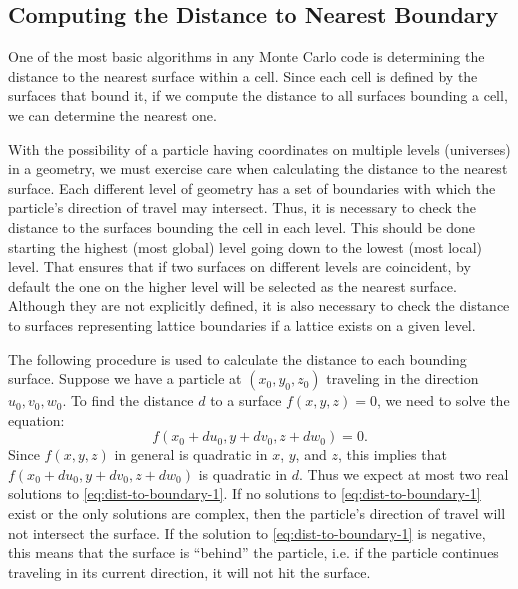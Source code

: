 \subsection{Computing the Distance to Nearest Boundary}

One of the most basic algorithms in any Monte Carlo code is determining the
distance to the nearest surface within a cell. Since each cell is defined by
the surfaces that bound it, if we compute the distance to all surfaces bounding
a cell, we can determine the nearest one.

With the possibility of a particle having coordinates on multiple levels
(universes) in a geometry, we must exercise care when calculating the distance
to the nearest surface. Each different level of geometry has a set of boundaries
with which the particle's direction of travel may intersect. Thus, it is
necessary to check the distance to the surfaces bounding the cell in each
level. This should be done starting the highest (most global) level going down
to the lowest (most local) level. That ensures that if two surfaces on different
levels are coincident, by default the one on the higher level will be selected
as the nearest surface. Although they are not explicitly defined, it is also
necessary to check the distance to surfaces representing lattice boundaries if a
lattice exists on a given level.

The following procedure is used to calculate the distance to each bounding
surface. Suppose we have a particle at $(x_0,y_0,z_0)$ traveling in the
direction $u_0,v_0,w_0$. To find the distance $d$ to a surface $f(x,y,z) = 0$,
we need to solve the equation:
\begin{equation}
  \label{eq:dist-to-boundary-1}
  f(x_0 + du_0, y + dv_0, z + dw_0) = 0.
\end{equation}
Since $f(x,y,z)$ in general is quadratic in $x$, $y$, and $z$, this implies that
$f(x_0 + du_0, y + dv_0, z + dw_0)$ is quadratic in $d$. Thus we expect at most
two real solutions to \eqref{eq:dist-to-boundary-1}. If no solutions to
\eqref{eq:dist-to-boundary-1} exist or the only solutions are complex, then the
particle's direction of travel will not intersect the surface. If the solution
to \eqref{eq:dist-to-boundary-1} is negative, this means that the surface is
``behind'' the particle, i.e. if the particle continues traveling in its current
direction, it will not hit the surface.

